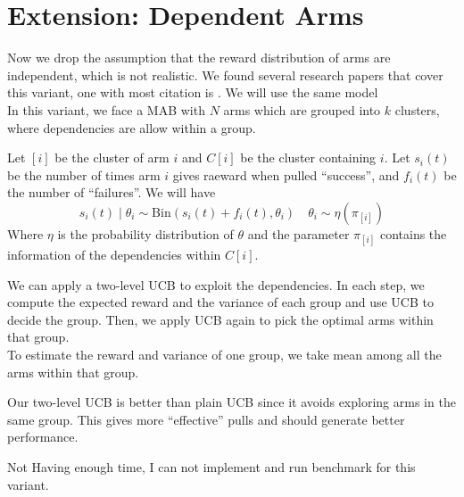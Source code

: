 \documentclass{article}
\newenvironment{newSec}[1]{
	\section{#1}
	\lhead{#1}
	\chead{}
	\rhead{}
}{ \newpage }
\begin{document}
\begin{newSec}{Extension: Dependent Arms}
	Now we drop the assumption that the reward distribution of arms are independent, which is not realistic.
	We found several research papers that cover this variant, one with most citation is \cite{paper:dep}. We will use the same model\\
	In this variant, we face a MAB with $N$ arms which are grouped into $k$ clusters, where dependencies are allow within a group.\par

	Let $[i]$ be the cluster of arm $i$ and $C[i]$ be the cluster containing $i$.
	Let $s_i(t)$ be the number of times arm $i$ gives raeward when pulled ``success'', and $f_i(t)$ be the number of ``failures''.
	We will have
	\[
		s_i(t)\mid \theta_i \sim \mathrm{Bin}(s_i(t)+f_i(t),\theta_i)
		\quad
		\theta_i \sim \eta(\pi_[i])
	\]
	Where $\eta$ is the probability distribution of $\theta$ and the parameter $\pi_[i]$ contains the information of the dependencies within $C[i]$.\par

	We can apply a two-level UCB to exploit the dependencies.
	In each step, we compute the expected reward and the variance of each group and use UCB to decide the group.
	Then, we apply UCB again to pick the optimal arms within that group.\\
	To estimate the reward and variance of one group, we take mean among all the arms within that group.\par

	Our two-level UCB is better than plain UCB since it avoids exploring arms in the same group.
	This gives more ``effective'' pulls and should generate better performance.

	\vspace{4ex}

	Not Having enough time, I can not implement and run benchmark for this variant.

\end{newSec}
\end{document}
